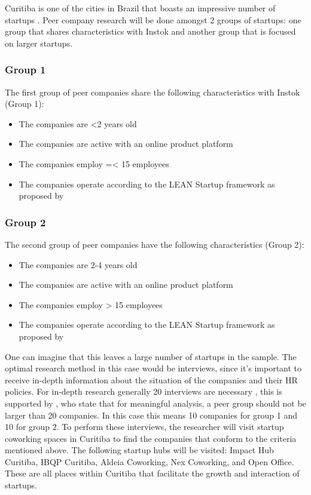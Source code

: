 \documentclass[man]{apa6}
\begin{document}
Curitiba is one of the cities in Brazil that boasts an impressive number of startups \parencite{SANTANA2016}.
Peer company research will be done amongst 2 groups of startups: one group that shares characteristics with Instok and another group that is focused on larger startups. \\

\subsubsection{Group 1} The first group of peer companies share the following characteristics with Instok (Group 1):
\begin{itemize}
\item The companies are <2 years old
\item The companies are active with an online product platform
\item The companies employ =< 15 employees
\item The companies operate according to the LEAN Startup framework as proposed by \cite{RIES2011}
\end{itemize}

\subsubsection{Group 2} The second group of peer companies have the following characteristics (Group 2):
\begin{itemize}
\item The companies are 2-4 years old
\item The companies are active with an online product platform
\item The companies employ > 15 employees
\item The companies operate according to the LEAN Startup framework as proposed by \cite{RIES2011}
\end{itemize}

One can imagine that this leaves a large number of startups in the sample. The optimal research method in this case would be interviews, since it's important to receive in-depth information about the situation of the companies and their HR policies. For in-depth research generally 20 interviews are necessary \parencite{BAKEREDWARDS2012}, this is supported by \cite{SNL2013}, who state that for meaningful analysis, a peer group should not be larger than 20 companies. In this case this means 10 companies for group 1 and 10 for group 2. To perform these interviews, the researcher will visit startup coworking spaces in Curitiba to find the companies that conform to the criteria mentioned above. The following startup hubs will be visited: Impact Hub Curitiba, IBQP Curitiba, Aldeia Coworking, Nex Coworking, and Open Office. These are all places within Curitiba that facilitate the growth and interaction of startups. \\
\end{document}
